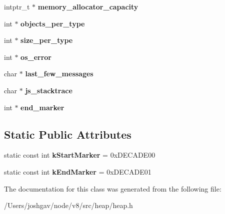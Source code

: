 \begin{DoxyCompactItemize}
\item 
intptr\+\_\+t $\ast$ {\bfseries memory\+\_\+allocator\+\_\+capacity}\hypertarget{classv8_1_1internal_1_1_heap_stats_a30176cd85df9e8c70ed6270bd1b8b17f}{}\label{classv8_1_1internal_1_1_heap_stats_a30176cd85df9e8c70ed6270bd1b8b17f}

\item 
int $\ast$ {\bfseries objects\+\_\+per\+\_\+type}\hypertarget{classv8_1_1internal_1_1_heap_stats_aac8323f5e3e9275f6077cc7748adc26f}{}\label{classv8_1_1internal_1_1_heap_stats_aac8323f5e3e9275f6077cc7748adc26f}

\item 
int $\ast$ {\bfseries size\+\_\+per\+\_\+type}\hypertarget{classv8_1_1internal_1_1_heap_stats_a43971e9e49e8aecc301d8b582e6de31a}{}\label{classv8_1_1internal_1_1_heap_stats_a43971e9e49e8aecc301d8b582e6de31a}

\item 
int $\ast$ {\bfseries os\+\_\+error}\hypertarget{classv8_1_1internal_1_1_heap_stats_aa6205c52d7b9a5b80a103034c6dd134f}{}\label{classv8_1_1internal_1_1_heap_stats_aa6205c52d7b9a5b80a103034c6dd134f}

\item 
char $\ast$ {\bfseries last\+\_\+few\+\_\+messages}\hypertarget{classv8_1_1internal_1_1_heap_stats_aa213d3ff3ede753af944d06fa726c668}{}\label{classv8_1_1internal_1_1_heap_stats_aa213d3ff3ede753af944d06fa726c668}

\item 
char $\ast$ {\bfseries js\+\_\+stacktrace}\hypertarget{classv8_1_1internal_1_1_heap_stats_ae0cc8db0b9dd4d309c4aa89c083a656e}{}\label{classv8_1_1internal_1_1_heap_stats_ae0cc8db0b9dd4d309c4aa89c083a656e}

\item 
int $\ast$ {\bfseries end\+\_\+marker}\hypertarget{classv8_1_1internal_1_1_heap_stats_a4d8063449d0c06ead66d72eacf2cd483}{}\label{classv8_1_1internal_1_1_heap_stats_a4d8063449d0c06ead66d72eacf2cd483}

\end{DoxyCompactItemize}
\subsection*{Static Public Attributes}
\begin{DoxyCompactItemize}
\item 
static const int {\bfseries k\+Start\+Marker} = 0x\+D\+E\+C\+A\+D\+E00\hypertarget{classv8_1_1internal_1_1_heap_stats_a205765088d14ac30ada403e983dc12da}{}\label{classv8_1_1internal_1_1_heap_stats_a205765088d14ac30ada403e983dc12da}

\item 
static const int {\bfseries k\+End\+Marker} = 0x\+D\+E\+C\+A\+D\+E01\hypertarget{classv8_1_1internal_1_1_heap_stats_a615e1138a3309a8a1a875f9aa93bf0ee}{}\label{classv8_1_1internal_1_1_heap_stats_a615e1138a3309a8a1a875f9aa93bf0ee}

\end{DoxyCompactItemize}


The documentation for this class was generated from the following file\+:\begin{DoxyCompactItemize}
\item 
/\+Users/joshgav/node/v8/src/heap/heap.\+h\end{DoxyCompactItemize}
